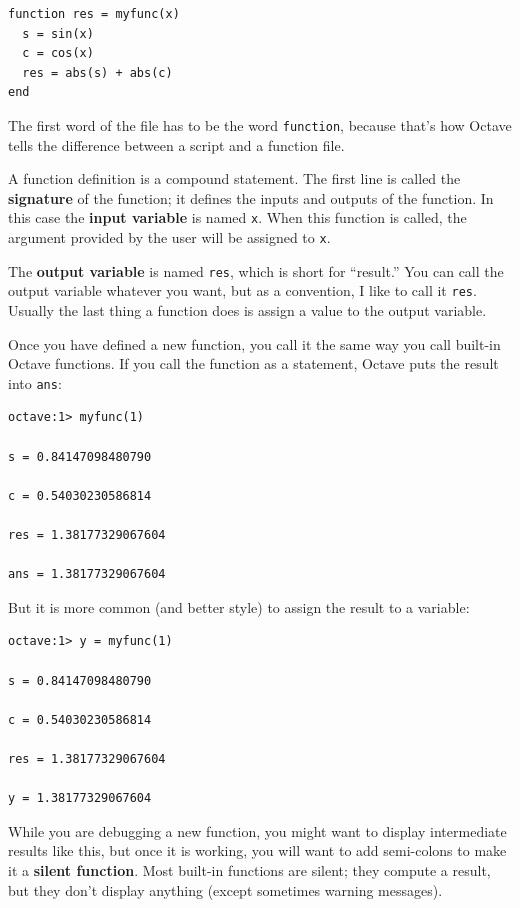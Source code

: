 \documentclass{book}
\begin{document}
\begin{verbatim}
function res = myfunc(x)
  s = sin(x)
  c = cos(x)
  res = abs(s) + abs(c)
end
\end{verbatim}

The first word of the file has to be the word {\tt function}, because
that's how Octave tells the difference between a script and a function
file.

A function definition is a compound statement. The first line
is called the {\bf signature} of the function; it defines
the inputs and outputs of the function. In this case the {\bf input
variable} is named {\tt x}. When this function is called, the
argument provided by the user will be assigned to {\tt x}.

The {\bf output variable} is named {\tt res}, which is short for
``result.'' You can call the output variable whatever you want, but
as a convention, I like to call it {\tt res}. Usually the last
thing a function does is assign a value to the output variable.

Once you have defined a new function, you call it the same way you
call built-in Octave functions. If you call the function as a statement,
Octave puts the result into {\tt ans}:

\begin{verbatim}
octave:1> myfunc(1)

s = 0.84147098480790

c = 0.54030230586814

res = 1.38177329067604

ans = 1.38177329067604
\end{verbatim}

But it is more common (and better style) to assign the result to
a variable:

\begin{verbatim}
octave:1> y = myfunc(1)

s = 0.84147098480790

c = 0.54030230586814

res = 1.38177329067604

y = 1.38177329067604
\end{verbatim}

While you are debugging a new function, you might want to display
intermediate results like this, but once it is working, you will want
to add semi-colons to make it a {\bf silent function}. Most built-in
functions are silent; they compute a result, but they don't display
anything (except sometimes warning messages).
\end{document}
